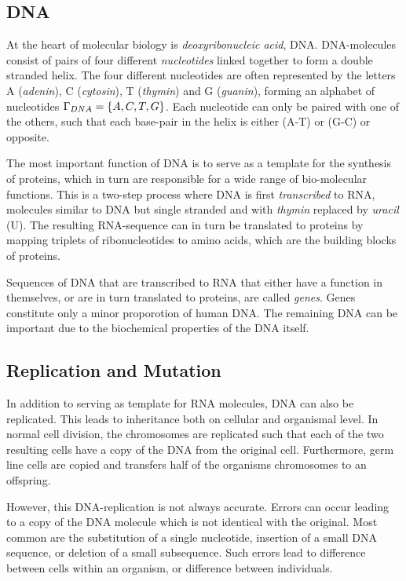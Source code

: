 \subsection{DNA}
At the heart of molecular biology is \emph{deoxyribonucleic acid}, DNA.
DNA-molecules consist of pairs of four different \emph{nucleotides} linked together to form a double stranded helix.
The four different nucleotides are often represented by the letters A (\emph{adenin}), C (\emph{cytosin}), T (\emph{thymin}) and G (\emph{guanin}), forming an alphabet of nucleotides $\Gamma_{DNA} = \left\{A, C, T, G\right\}$.
Each nucleotide can only be paired with one of the others, such that each base-pair in the helix is either (A-T) or (G-C) or opposite. 

The most important function of DNA is to serve as a template for the synthesis of proteins, which in turn are responsible for a wide range of bio-molecular functions.
This is a two-step process where DNA is first \emph{transcribed} to RNA, molecules similar to DNA but single stranded and with \emph{thymin} replaced by \emph{uracil} (U).
The resulting RNA-sequence can in turn be translated to proteins by mapping triplets of ribonucleotides to amino acids, which are the building blocks of proteins.

Sequences of DNA that are transcribed to RNA that either have a function in themselves, or are in turn translated to proteins, are called \emph{genes}.
Genes constitute only a minor proporotion of human DNA. The remaining DNA can be important due to the biochemical properties of the DNA itself. 

\subsection{Replication and Mutation}
In addition to serving as template for RNA molecules, DNA can also be replicated. This leads to inheritance both on cellular and organismal level. In normal cell division, the chromosomes are replicated such that each of the two resulting cells have a copy of the DNA from the original cell. Furthermore, germ line cells are copied and transfers half of the organisms chromosomes to an offspring. 

However, this DNA-replication is not always accurate.
Errors can occur leading to a copy of the DNA molecule which is not identical with the original.
Most common are the substitution of a single nucleotide, insertion of a small DNA sequence, or deletion of a small subsequence. Such errors lead to difference between cells within an organism, or difference between individuals.

